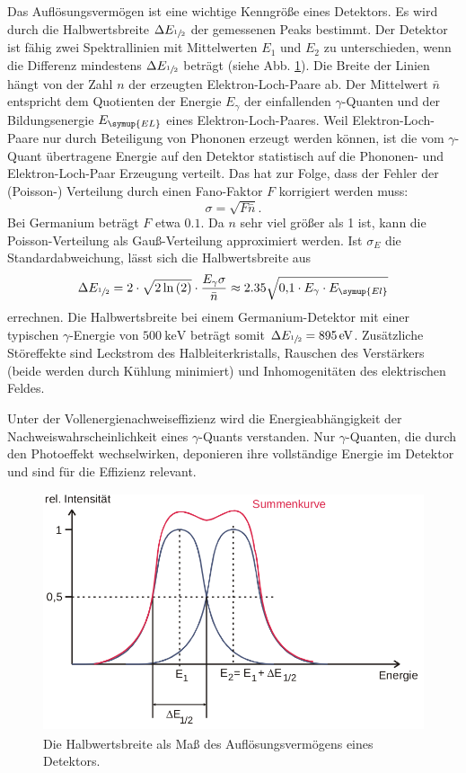 Das Auflösungsvermögen ist eine wichtige Kenngröße eines Detektors.
Es wird durch die Halbwertsbreite $\Delta E_{\sfrac{1}{2}}$ der gemessenen Peaks bestimmt.
Der Detektor ist fähig zwei Spektrallinien mit Mittelwerten $E_1$ und $E_2$ zu unterschieden, wenn die Differenz mindestens $\Delta E_{\sfrac{1}{2}}$ beträgt (siehe Abb. \ref{fig:Breite}).
Die Breite der Linien hängt von der Zahl $n$ der erzeugten Elektron-Loch-Paare ab.
Der Mittelwert $\bar{n}$ entspricht dem Quotienten der Energie $E_{\gamma}$ der einfallenden $\gamma$-Quanten und der Bildungsenergie $E_{\symup{EL}}$ eines Elektron-Loch-Paares.
Weil Elektron-Loch-Paare nur durch Beteiligung von Phononen erzeugt werden können, ist die vom $\gamma$-Quant übertragene Energie auf den Detektor statistisch auf die Phononen- und Elektron-Loch-Paar Erzeugung verteilt.
Das hat zur Folge, dass der Fehler der (Poisson-) Verteilung durch einen Fano-Faktor $F$ korrigiert werden muss:
\begin{equation*}
\sigma = \sqrt{F\bar{n}}.
\end{equation*}
Bei Germanium beträgt $F$ etwa $0.1$.
Da $n$ sehr viel größer als \num{1} ist, kann die Poisson-Verteilung als Gauß-Verteilung approximiert werden.
Ist $\sigma_E$ die Standardabweichung, lässt sich die Halbwertsbreite aus
\begin{equation}
\label{eq:aufloesung}
\Delta E_{\sfrac{1}{2}} = 2 \cdot \sqrt{2\ln{(2)}}\cdot\frac{E_{\gamma}\sigma}{\bar{n}} \approx 2.35\sqrt{\num{0.1} \cdot E_\gamma \cdot E_{\symup{El}}}
\end{equation}
errechnen.
Die Halbwertsbreite bei einem Germanium-Detektor mit einer typischen $\gamma$-Energie von $\SI{500}{\kilo\electronvolt}$ beträgt somit $\Delta E_{\sfrac{1}{2}} =\SI{895}{\electronvolt}$.
Zusätzliche Störeffekte sind Leckstrom des Halbleiterkristalls, Rauschen des Verstärkers (beide werden durch Kühlung minimiert) und Inhomogenitäten des elektrischen Feldes.

Unter der Vollenergienachweiseffizienz wird die Energieabhängigkeit der Nachweiswahrscheinlichkeit eines $\gamma$-Quants verstanden.
Nur $\gamma$-Quanten, die durch den Photoeffekt wechselwirken, deponieren ihre vollständige Energie im Detektor und sind für die Effizienz relevant.

 \begin{figure}
   \centering
   \includegraphics[height=7cm]{content/pictures/Breite.png}
   \caption{Die Halbwertsbreite als Maß des Auflösungsvermögens eines Detektors.\cite{V18}}
   \label{fig:Breite}
 \end{figure}

